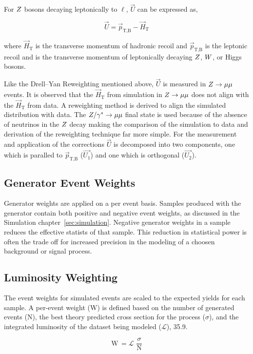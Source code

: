 For $Z$ bosons decaying leptonically to $\ell$, $\vec{U}$ can be expressed as,

\begin{equation}
\vec{U} = \vec{p}_{\text{T,B}} - \vec{H}_{\text{T}}
\end{equation}

where $\vec{H}_{\text{T}}$ is the transverse momentum of hadronic recoil and $\vec{p}_{\text{T,B}}$
is the leptonic recoil and is the transverse momentum of leptonically decaying $Z$, $W$, or Higgs bosons.

Like the Drell--Yan Reweighting mentioned above, $\vec{U}$ is measured in $Z\to\mu\mu$ events.
It is observed that the $\vec{H}_{\text{T}}$ from simulation in $Z\to\mu\mu$ does not align with
the $\vec{H}_{\text{T}}$ from data. A reweighting method is derived to align the simulated distribution with 
data. The $Z/\gamma^*\to\mu\mu$
final state is used because of the absence of neutrinos in the $Z$ decay making the comparison of
the simulation to data and derivation of the reweighting technique far more simple. For the measurement
and application of the corrections $\vec{U}$ is decomposed into two components, one which is
paralled to $\vec{p}_{\text{T,B}}$ ($\vec{U_{1}}$) and one which is orthogonal ($\vec{U_{2}}$).


\subsection{Generator Event Weights}
Generator weights are applied on a per event basis. Samples produced with the \MGAMCNLO generator
contain both positive and negative event weights, as discussed in the Simulation chapter~\ref{sec:simulation}.
Negative generator weights in a sample reduces the effective statists of that sample. This reduction
in statistical power is often the trade off for increased precision in the modeling of a choosen
background or signal process.


\subsection{Luminosity Weighting}
The event weights for simulated events are scaled to the expected yields for each sample. A per-event
weight (W) is defined based on the number of generated events (N), the best theory predicted cross section
for the process ($\sigma$), and the integrated luminosity of the dataset being modeled 
($\mathcal{L}$), 35.9\fbinv.

\begin{equation}
\text{W} \, = \mathcal{L} \, \,  \frac{\sigma}{\text{N}}
\end{equation}

